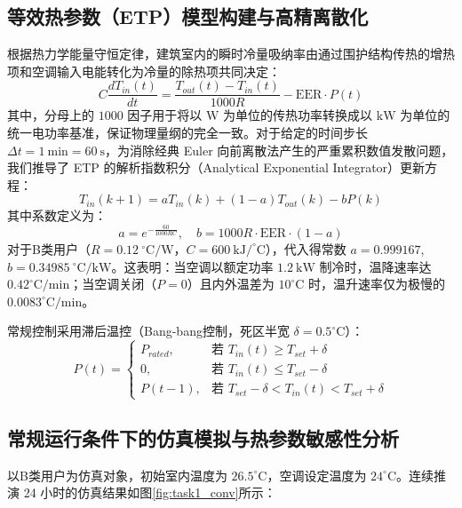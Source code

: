 \documentclass[12pt,a4paper]{article}
\begin{document}
\subsection{等效热参数（ETP）模型构建与高精离散化}
根据热力学能量守恒定律，建筑室内的瞬时冷量吸纳率由通过围护结构传热的增热项和空调输入电能转化为冷量的除热项共同决定：
\begin{equation}
    C \frac{dT_{in}(t)}{dt} = \frac{T_{out}(t) - T_{in}(t)}{1000 R} - \text{EER} \cdot P(t)
    \label{eq:etp_cont}
\end{equation}
其中，分母上的 $1000$ 因子用于将以 $\text{W}$ 为单位的传热功率转换成以 $\text{kW}$ 为单位的统一电功率基准，保证物理量纲的完全一致。对于给定的时间步长 $\Delta t = 1\ \text{min} = 60\ \text{s}$，为消除经典 Euler 向前离散法产生的严重累积数值发散问题，我们推导了 ETP 的解析指数积分（Analytical Exponential Integrator）更新方程：
\begin{equation}
    T_{in}(k+1) = a T_{in}(k) + (1-a) T_{out}(k) - b P(k)
    \label{eq:etp_disc}
\end{equation}
其中系数定义为：
\begin{equation}
    a = e^{-\frac{60}{1000 R C}}, \quad b = 1000 R \cdot \text{EER} \cdot (1-a)
\end{equation}
对于B类用户（$R = 0.12\ ^\circ\text{C/W}$，$C = 600\ \text{kJ/}^\circ\text{C}$），代入得常数 $a = 0.999167$, $b = 0.34985\ ^\circ\text{C/kW}$。这表明：当空调以额定功率 $1.2\ \text{kW}$ 制冷时，温降速率达 $0.42^\circ\text{C}/\text{min}$；当空调关闭（$P=0$）且内外温差为 $10^\circ\text{C}$ 时，温升速率仅为极慢的 $0.0083^\circ\text{C}/\text{min}$。

常规控制采用滞后温控（Bang-bang控制，死区半宽 $\delta = 0.5^\circ\text{C}$）：
\begin{equation}
    P(t) = 
    \begin{cases}
        P_{rated}, & \text{若 } T_{in}(t) \ge T_{set} + \delta \\
        0, & \text{若 } T_{in}(t) \le T_{set} - \delta \\
        P(t-1), & \text{若 } T_{set} - \delta < T_{in}(t) < T_{set} + \delta
    \end{cases}
\end{equation}

\subsection{常规运行条件下的仿真模拟与热参数敏感性分析}
以B类用户为仿真对象，初始室内温度为 $26.5^\circ\text{C}$，空调设定温度为 $24^\circ\text{C}$。连续推演 24 小时的仿真结果如图\ref{fig:task1_conv}所示：
\end{document}
